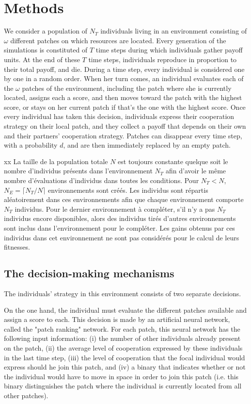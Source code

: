 \section{Methods}

We consider a population of $N_T$ individuals living in an environment consisting of $\omega$ different patches on which resources are located. Every generation of the simulations is constituted of $T$ time steps during which individuals gather payoff units. At the end of these $T$ time steps, individuals reproduce in proportion to their total payoff, and die. During a time step, every individual is considered one by one in a random order. When her turn comes, an individual evaluates each of the $\omega$ patches of the environment, including the patch where she is currently located, assigns each a score, and then moves toward the patch with the highest score, or stays on her current patch if that's the one with the highest score. Once every individual has taken this decision, individuals express their cooperation strategy on their local patch, and they collect a payoff that depends on their own and their partners' cooperation strategy. Patches can disappear every time step, with a probability $d$, and are then immediately replaced by an empty patch.

xx La taille de la population totale $N$ est toujours constante quelque soit le nombre d'individus présents dans l'environnement $N_T$ afin d'avoir le même nombre d'évaluations d'individus dans toutes les conditions. Pour $N_T < N$, $N_E = \lceil N_T / N \rceil$ environnements sont créés. Les individus sont répartis aléatoirement dans ces environnements afin que chaque environnement comporte $N_T$ individus. Pour le dernier environnement à compléter, s'il n'y a pas $N_T$ individus encore disponibles, alors des individus tirés d'autres environnements sont inclus dans l'environnement pour le compléter. Les gains obtenus par ces individus dans cet environnement ne sont pas considérés pour le calcul de leurs fitnesses.

\subsection{The decision-making mechanisms}

The individuals' strategy in this environment consists of two separate decisions.

On the one hand, the individual must evaluate the different patches available and assign a score to each. This decision is made by an artificial neural network, called the "patch ranking" network. For each patch, this neural network has the following input information: (i) the number of other individuals already present on the patch, (ii) the average level of cooperation expressed by these individuals in the last time step, (iii) the level of cooperation that the focal individual would express should he join this patch, and (iv) a binary that indicates whether or not the individual would have to move in space in order to join this patch (i.e. this binary distinguishes the patch where the individual is currently located from all other patches).

